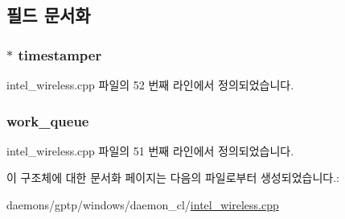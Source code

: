 \subsection{필드 문서화}
\subsubsection[{\texorpdfstring{timestamper}{timestamper}}]{$\ast$ timestamper}\hypertarget{struct_timestamper_context_a3a11352e788e274aa34578727c3ceba7}{}\label{struct_timestamper_context_a3a11352e788e274aa34578727c3ceba7}


intel\+\_\+wireless.\+cpp 파일의 52 번째 라인에서 정의되었습니다.

\subsubsection[{\texorpdfstring{work\+\_\+queue}{work_queue}}]{ work\+\_\+queue}\hypertarget{struct_timestamper_context_a7b3e21543015452f5af47b58cd6f4fae}{}\label{struct_timestamper_context_a7b3e21543015452f5af47b58cd6f4fae}


intel\+\_\+wireless.\+cpp 파일의 51 번째 라인에서 정의되었습니다.



이 구조체에 대한 문서화 페이지는 다음의 파일로부터 생성되었습니다.\+:\begin{DoxyCompactItemize}
\item 
daemons/gptp/windows/daemon\+\_\+cl/\hyperlink{intel__wireless_8cpp}{intel\+\_\+wireless.\+cpp}\end{DoxyCompactItemize}
